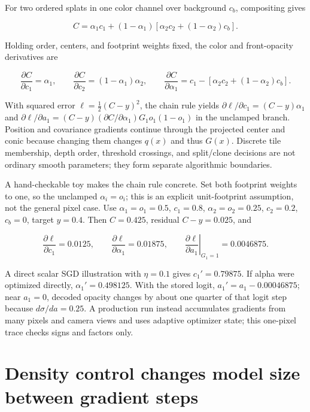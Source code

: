 For two ordered splats in one color channel over background \(c_b\), compositing gives

\[
C=\alpha_1c_1+(1-\alpha_1)\left[\alpha_2c_2+(1-\alpha_2)c_b\right].
\]

Holding order, centers, and footprint weights fixed, the color and front-opacity derivatives are

\[
\frac{\partial C}{\partial c_1}=\alpha_1,\qquad
\frac{\partial C}{\partial c_2}=(1-\alpha_1)\alpha_2,
\qquad
\frac{\partial C}{\partial\alpha_1}=c_1-\left[\alpha_2c_2+(1-\alpha_2)c_b\right].
\]

With squared error \(\ell=\tfrac12(C-y)^2\), the chain rule yields \(\partial\ell/\partial c_1=(C-y)\alpha_1\) and \(\partial\ell/\partial a_1=(C-y)(\partial C/\partial\alpha_1)G_1o_1(1-o_1)\) in the unclamped branch. Position and covariance gradients continue through the projected center and conic because changing them changes \(q(x)\) and thus \(G(x)\). Discrete tile membership, depth order, threshold crossings, and split/clone decisions are not ordinary smooth parameters; they form separate algorithmic boundaries.

A hand-checkable toy makes the chain rule concrete. Set both footprint weights to one, so the unclamped \(\alpha_i=o_i\); this is an explicit unit-footprint assumption, not the general pixel case. Use \(\alpha_1=o_1=0.5\), \(c_1=0.8\), \(\alpha_2=o_2=0.25\), \(c_2=0.2\), \(c_b=0\), target \(y=0.4\). Then \(C=0.425\), residual \(C-y=0.025\), and

\[
\frac{\partial\ell}{\partial c_1}=0.0125,\qquad
\frac{\partial\ell}{\partial\alpha_1}=0.01875,\qquad
\left.\frac{\partial\ell}{\partial a_1}\right|_{G_1=1}=0.0046875.
\]

A direct scalar SGD illustration with \(\eta=0.1\) gives \(c_1'=0.79875\). If alpha were optimized directly, \(\alpha_1'=0.498125\). With the stored logit, \(a_1'=a_1-0.00046875\); near \(a_1=0\), decoded opacity changes by about one quarter of that logit step because \(d\sigma/da=0.25\). A production run instead accumulates gradients from many pixels and camera views and uses adaptive optimizer state; this one-pixel trace checks signs and factors only.

\section{Density control changes model size between gradient steps}\label{04-visual-computing-ii-ch039-density-control-changes-model-size-between-gradient-steps}

